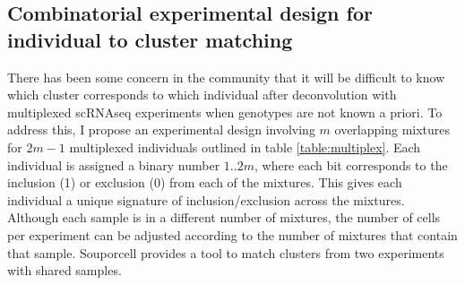 \subsection{Combinatorial experimental design for individual to cluster matching}
\par{
There has been some concern in the community that it will be difficult to know which cluster corresponds to which individual after deconvolution with multiplexed scRNAseq experiments when genotypes are not known a priori. To address this, I propose an experimental design involving $m$ overlapping mixtures for $2m-1$ multiplexed individuals outlined in table \ref{table:multiplex}. Each individual is assigned a binary number $1..2m$, where each bit corresponds to the inclusion (1) or exclusion (0) from each of the mixtures. This gives each individual a unique signature of inclusion/exclusion across the mixtures. Although each sample is in a different number of mixtures, the number of cells per experiment can be adjusted according to the number of mixtures that contain that sample. Souporcell provides a tool to match clusters from two experiments with shared samples.
}



\begin{table}


\caption{Experimental design for matching individuals to clusters}\label{table:multiplex}
\hfil
{}

\end{table}




